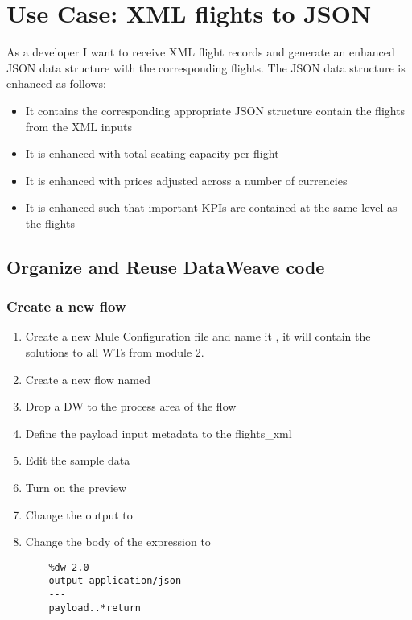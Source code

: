 \chapter{ Use Case: XML flights to JSON }
As a developer I want to receive XML flight records and generate an enhanced JSON data structure with the corresponding flights.
\newline
The JSON data structure is enhanced as follows:
\begin{itemize}
\item It contains the corresponding appropriate JSON structure contain the flights from the XML inputs
\item It is enhanced with total seating capacity per flight
\item It is enhanced with prices adjusted across a number of currencies
\item It is enhanced such that important KPIs are contained at the same level as the flights
\end{itemize}
\section{Organize and Reuse DataWeave code}

\subsection{Create a new flow}
\begin{enumerate}
\item Create a new Mule Configuration file and name it , it will contain the solutions to all WTs from module 2.
\item Create a new flow named 
\item Drop a DW to the process area of the flow
\item Define the payload input metadata to the flights\_xml
\item Edit the sample data
\item Turn on the preview
\item Change the output to 
\item Change the body of the expression to
  \begin{lstlisting}
    %dw 2.0
    output application/json
    ---
    payload..*return
  \end{lstlisting}
\end{enumerate}

